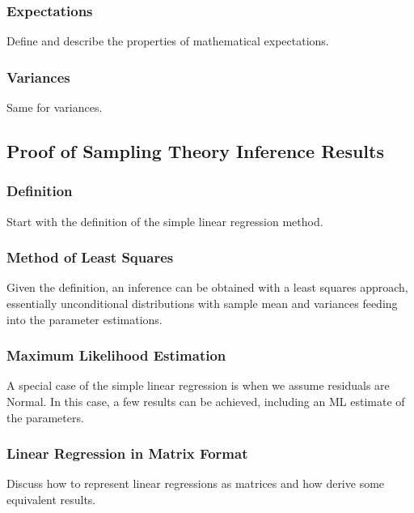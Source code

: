 \documentclass[11pt,a4paper]{article}
\begin{document}
\subsubsection{Expectations}

Define and describe the properties of mathematical expectations.

\subsubsection{Variances}

Same for variances.

\subsection{Proof of Sampling Theory Inference Results}

\subsubsection{Definition}

Start with the definition of the simple linear regression method.

\subsubsection{Method of Least Squares}

Given the definition, 
an inference can be obtained with a least squares approach, 
essentially unconditional distributions with sample mean and
variances feeding into the parameter estimations.

\subsubsection{Maximum Likelihood Estimation}

A special case of the simple linear regression is when we assume
residuals are Normal. 
In this case, a few results can be achieved,
including an ML estimate of the parameters.

\subsubsection{Linear Regression in Matrix Format}

Discuss how to represent linear regressions as matrices and how derive some equivalent results.
\end{document}
